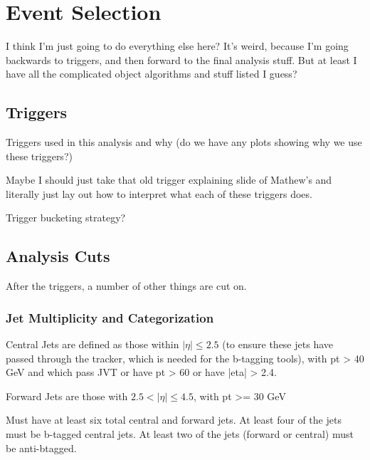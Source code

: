 \chapter{Event Selection} \label{chapter:selection}
    
    I think I'm just going to do everything else here? It's weird, because I'm going backwards to triggers,
        and then forward to the final analysis stuff. But at least I have all the complicated object algorithms and stuff listed I guess?


    \section{Triggers}

        

        Triggers used in this analysis and why (do we have any plots showing why we use these triggers?)

        Maybe I should just take that old trigger explaining slide of Mathew's
            and literally just lay out how to interpret what each of these triggers does.

        Trigger bucketing strategy?


    \section{Analysis Cuts} \label{sec:analysis_cuts}

        After the triggers, a number of other things are cut on.

    \subsection{Jet Multiplicity and Categorization}

        Central Jets are defined as those within $|\eta| \leq 2.5$
            (to ensure these jets have passed through the tracker, which is needed for the b-tagging tools\cite{vbf_hh_4b_resonant_2018_int}),
            with pt > 40 GeV and which pass JVT or have pt > 60 or have |eta| > 2.4. %
        
        Forward Jets are those with $ 2.5 < |\eta| \leq 4.5 $, 
            with pt >= 30 GeV %

        Must have at least six total central and forward jets.
        At least four of the jets must be b-tagged central jets.
        At least two of the jets (forward or central) must be anti-btagged.


